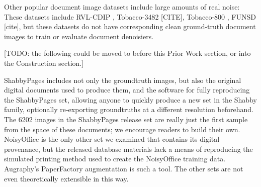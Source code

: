 \documentclass[runningheads]{llncs}
\begin{document}
Other popular document image datasets include large amounts of real noise: These datasets include RVL-CDIP \cite{ref_RVL-CDIP}, Tobacco-3482 [CITE], Tobacco-800 \cite{ref_Tobacco800}, FUNSD [cite], but these datasets do not have corresponding clean ground-truth document images to train or evaluate document denoisiers.

[TODO: the following could be moved to before this Prior Work section, or into the Construction section.]


ShabbyPages includes not only the groundtruth images, but also the original digital documents used to produce them, and the software for fully reproducing the ShabbyPages set, allowing anyone to quickly produce a new set in the Shabby family, optionally re-exporting groundtruths at a different resolution beforehand.
The 6202 images in the ShabbyPages release set are really just the first sample from the space of these documents; we encourage readers to build their own.
NoisyOffice is the only other set we examined that contains its digital provenance, but the released database materials lack a means of reproducing the simulated printing method used to create the NoisyOffice training data.
Augraphy's PaperFactory augmentation is such a tool.
The other sets are not even theoretically extensible in this way.

\end{document}
